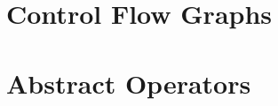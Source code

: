 \documentclass[twoside,11pt,openright]{report}
\theoremstyle{definition}
\begin{document}
%

\chapter{Control Flow Graphs}
\label{app:cfg}


\chapter{Abstract Operators}
\label{app:abstract_operators}


\end{document}
